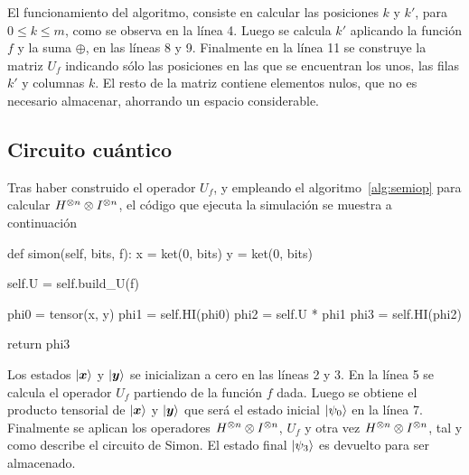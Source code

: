 El funcionamiento del algoritmo, consiste en calcular las posiciones $k$ y $k'$, 
para $0 \leq k \leq m$, como se observa en la línea 4. Luego se calcula $k'$ 
aplicando la función $f$ y la suma $\oplus$, en las líneas 8 y 9. Finalmente en 
la línea 11 se construye la matriz $U_f$ indicando sólo las posiciones en las 
que se encuentran los unos, las filas $k'$ y columnas $k$. El resto de la matriz 
contiene elementos nulos, que no es necesario almacenar, ahorrando un espacio 
considerable.

\subsection{Circuito cuántico}
Tras haber construido el operador $U_f$, y empleando el 
algoritmo~\ref{alg:semiop} para calcular ${H}^{\otimes n} \otimes {I}^{\otimes n}$, el código 
que ejecuta la simulación se muestra a continuación
\begin{pycode}
def simon(self, bits, f):
	x = ket(0, bits)
	y = ket(0, bits)

	self.U = self.build_U(f)

	phi0 = tensor(x, y)
	phi1 = self.HI(phi0)
	phi2 = self.U * phi1
	phi3 = self.HI(phi2)

	return phi3
\end{pycode}

Los estados $\ket{\boldsymbol{x}}$ y $\ket{\boldsymbol{y}}$ se inicializan a cero en las líneas 2 y 
3. En la línea 5 se calcula el operador $U_f$ partiendo de la función $f$ dada.  
Luego se obtiene el producto tensorial de $\ket{\boldsymbol{x}}$ y $\ket{\boldsymbol{y}}$ que será 
el estado inicial $\ket{\psi_{0}} $ en la línea 7. Finalmente se aplican los operadores 
${H}^{\otimes n} \otimes {I}^{\otimes n}$, $U_f$ y otra vez ${H}^{\otimes n} \otimes {I}^{\otimes n}$, tal y 
como describe el circuito de Simon. El estado final $\ket{\psi_{3}}$ es devuelto para 
ser almacenado.

